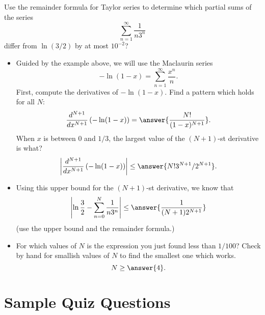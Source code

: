 \documentclass{ximera}
\begin{document}
\begin{exercise}
Use the remainder formula for Taylor series to determine which partial sums of the series
\[ \sum_{n=1}^\infty \frac{1}{n 3^n} \]
differ from $\ln (3/2)$ by at most $10^{-2}$?
\begin{itemize}
\item Guided by the example above, we will use the Maclaurin series 
\[ - \ln (1-x) = \sum_{n=1}^\infty \frac{x^n}{n}. \]
First, compute the derivatives of $- \ln (1-x)$. Find a pattern which holds for all $N$:
\[ \frac{d^{N+1}}{dx^{N+1}} \left( - \ln (1 - x) \right)  = \answer{ \frac{N!}{(1-x)^{N+1}}}. \]
When $x$ is between $0$ and $1/3$, the largest value of the $(N+1)$-st derivative is what?
\[ \left| \frac{d^{N+1}}{dx^{N+1}} \left( - \ln (1 - x) \right) \right| \leq \answer{N! 3^{N+1}/2^{N+1}}. \]
\item Using this upper bound for the $(N+1)$-st derivative, we know that
\[ \left| \ln \frac{3}{2} - \sum_{n=0}^N \frac{1}{n 3^n} \right| \leq \answer{ \frac{1}{(N+1) 2^{N+1}}} \]
(use the upper bound and the remainder formula.)
\item For which values of $N$ is the expression you just found less than $1/100$? Check by hand for smallish values of $N$ to find the smallest one which works.
\[ N \geq \answer{4}. \]
\end{itemize}
\end{exercise}



\section*{Sample Quiz Questions}
\end{document}
